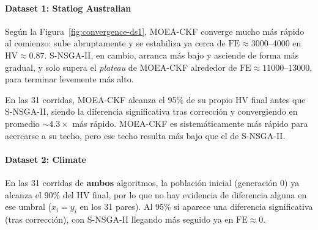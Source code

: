 \paragraph{Dataset 1: Statlog Australian}\label{sec:ds1-convergencia}

Según la Figura~\ref{fig:convergence-ds1}, MOEA-CKF converge mucho más rápido al comienzo: sube abruptamente y se estabiliza ya cerca de $\text{FE}\approx3000$--$4000$ en $\text{HV}\approx0.87$. S-NSGA-II, en cambio, arranca más bajo y asciende de forma más gradual, y solo supera el \textit{plateau} de MOEA-CKF alrededor de $\text{FE}\approx11000$--$13000$, para terminar levemente más alto.

En las 31 corridas, MOEA-CKF alcanza el 95\% de su propio HV final antes que S-NSGA-II, siendo la diferencia significativa tras corrección y convergiendo en promedio $\sim4.3\times$ más rápido. MOEA-CKF es sistemáticamente más rápido para acercarse a su techo, pero ese techo resulta más bajo que el de S-NSGA-II.


\paragraph{Dataset 2: Climate}\label{sec:ds2-convergencia}

En las 31 corridas de \textbf{ambos} algoritmos, la población inicial (generación 0) ya alcanza el 90\% del HV final, por lo que no hay evidencia de diferencia alguna en ese umbral ($x_i=y_i$ en los 31 pares). Al 95\% sí aparece una diferencia significativa (tras corrección), con S-NSGA-II llegando más seguido ya en $\text{FE}\approx0$. 


